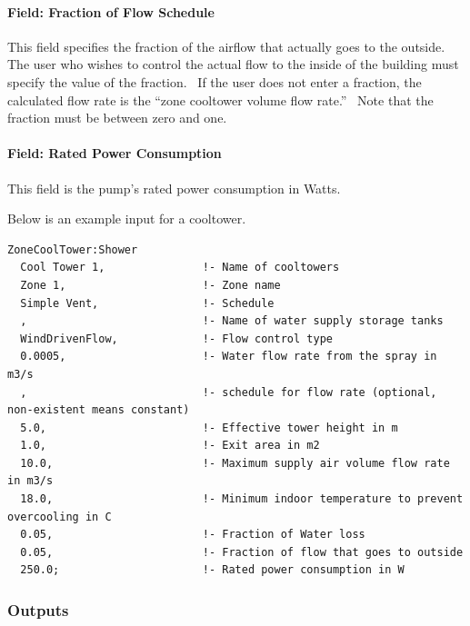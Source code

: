 \paragraph{Field: Fraction of Flow Schedule}\label{field-fraction-of-flow-schedule}

This field specifies the fraction of the airflow that actually goes to the outside.~ The user who wishes to control the actual flow to the inside of the building must specify the value of the fraction.~ If the user does not enter a fraction, the calculated flow rate is the ``zone cooltower volume flow rate.''~ Note that the fraction must be between zero and one.

\paragraph{Field: Rated Power Consumption}\label{field-rated-power-consumption}

This field is the pump's rated power consumption in Watts.

Below is an example input for a cooltower.

\begin{lstlisting}
ZoneCoolTower:Shower
  Cool Tower 1,               !- Name of cooltowers
  Zone 1,                     !- Zone name
  Simple Vent,                !- Schedule
  ,                           !- Name of water supply storage tanks
  WindDrivenFlow,             !- Flow control type
  0.0005,                     !- Water flow rate from the spray in m3/s
  ,                           !- schedule for flow rate (optional, non-existent means constant)
  5.0,                        !- Effective tower height in m
  1.0,                        !- Exit area in m2
  10.0,                       !- Maximum supply air volume flow rate in m3/s
  18.0,                       !- Minimum indoor temperature to prevent overcooling in C
  0.05,                       !- Fraction of Water loss
  0.05,                       !- Fraction of flow that goes to outside
  250.0;                      !- Rated power consumption in W
\end{lstlisting}

\subsubsection{Outputs}\label{outputs-6-000}

